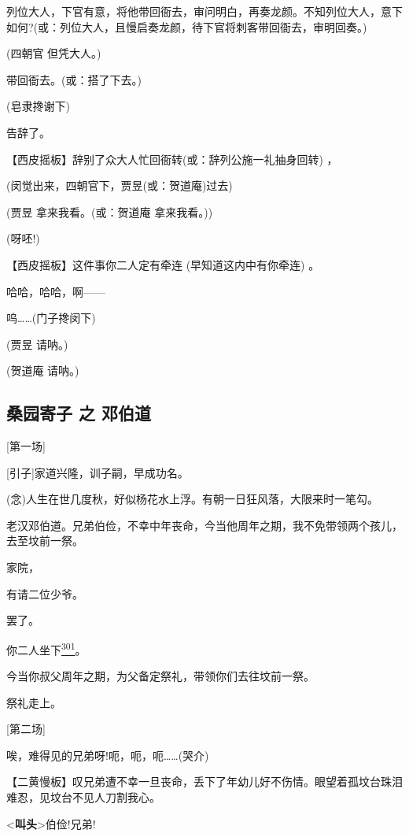 列位大人，下官有意，将他带回衙去，审问明白，再奏龙颜。不知列位大人，意下如何?(或：列位大人，且慢启奏龙颜，待下官将刺客带回衙去，审明回奏。)

(四朝官 但凭大人。)

带回衙去。(或：搭了下去。)

(皂隶搀谢下)

告辞了。

【西皮摇板】辞别了众大人忙回衙转(或：辞列公施一礼抽身回转) ，

(闵觉出来，四朝官下，贾昱(或：贺道庵)过去)

(贾昱 拿来我看。(或：贺道庵 拿来我看。))

(呀呸!)

【西皮摇板】这件事你二人定有牵连 (早知道这内中有你牵连) 。

哈哈，哈哈，啊------

呜\ldots{}\ldots{}(门子搀闵下)

(贾昱 请呐。)

(贺道庵 请呐。)

\newpage
\hypertarget{ux6851ux56edux5bc4ux5b50-ux4e4b-ux9093ux4f2fux9053}{%
\subsection{桑园寄子 之
邓伯道}\label{ux6851ux56edux5bc4ux5b50-ux4e4b-ux9093ux4f2fux9053}}

{[}第一场{]}

{[}引子{]}家道兴隆，训子嗣，早成功名。

(念)人生在世几度秋，好似杨花水上浮。有朝一日狂风落，大限来时一笔勾。

老汉邓伯道。兄弟伯俭，不幸中年丧命，今当他周年之期，我不免带领两个孩儿，去至坟前一祭。

家院，

有请二位少爷。

罢了。

你二人坐下\protect\hyperlink{fn301}{\textsuperscript{301}}。

今当你叔父周年之期，为父备定祭礼，带领你们去往坟前一祭。

祭礼走上。

{[}第二场{]}

唉，难得见的兄弟呀!呃，呃，呃\ldots{}\ldots{}(哭介)

【二黄慢板】叹兄弟遭不幸一旦丧命，丢下了年幼儿好不伤情。眼望着孤坟台珠泪难忍，见坟台不见人刀割我心。

\textless{}\textbf{叫头}\textgreater{}伯俭!兄弟!

